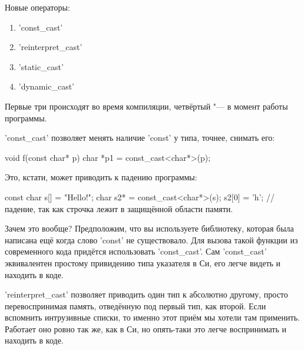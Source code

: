 Новые операторы:

\begin{enumerate}
	\item \cpp'const_cast'
	\item \cpp'reinterpret_cast'
	\item \cpp'static_cast'
	\item \cpp'dynamic_cast'
\end{enumerate}

Первые три происходят во время компиляции, четвёртый "--- в момент работы программы.

\cpp'const_cast' позволяет менять наличие \cpp'const' у типа, точнее, снимать его:
\begin{cppcode}
void f(const char* p)
{
	char *p1 = const_cast<char*>(p);
}
\end{cppcode}

Это, кстати, может приводить к падению программы:
\begin{cppcode}
const char s[] = "Hello!";
char s2* = const_cast<char*>(s);
s2[0] = 'h'; // падение, так как строчка лежит в защищённой области памяти.
\end{cppcode}

Зачем это вообще?
Предположим, что вы используете библиотеку, которая была написана ещё когда слово \cpp'const' не существовало.
Для вызова такой функции из современного кода придётся использовать \cpp'const_cast'.
Сам \cpp'const_cast' эквивалентен простому привидению типа указателя в Си, его легче видеть и находить в коде.

\cpp'reinterpret_cast' позволяет приводить один тип к абсолютно другому, просто перевоспринимая память, отведённую под первый тип, как второй.
Если вспомнить интрузивные списки, то именно этот приём мы хотели там применить. Работает оно ровно так же, как в Си, но опять-таки это легче воспринимать и находить в коде.

